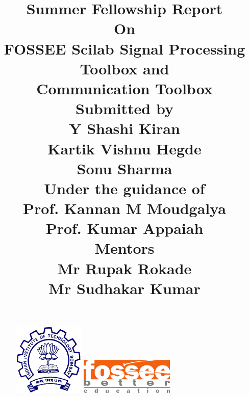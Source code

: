 \documentclass[12pt,a4paper]{report}
\begin{document}
\begin{figure}
\centering
\includegraphics[width = 0.3\textwidth]{iit.png}
\hspace{1cm}
\includegraphics[width = 0.4\textwidth]{fossee-logo.png}
\end{figure}

\title{\textbf{\textbf{Summer Fellowship Report}}\vspace{3mm} \\\small On \\\vspace{3mm} \textbf{\large FOSSEE Scilab Signal Processing Toolbox and\\ Communication Toolbox}\vspace{3mm} \\ \vspace{3mm}\small Submitted by\\  \vspace{3mm}  \large \textbf{Y Shashi Kiran}\\ \vspace{2mm}  \large \textbf{Kartik Vishnu Hegde}\\ \vspace{2mm}  \large \textbf{Sonu Sharma}\\ \vspace{7mm}
\small Under the guidance of \\  \vspace{3mm}
\large \textbf{Prof. Kannan M Moudgalya} \vspace{1mm}\\
\large \textbf{Prof. Kumar Appaiah} \vspace{5 mm}\\
\small Mentors
\\ 
\vspace{1mm} \large \textbf{Mr Rupak Rokade}\\ 
\vspace{1mm}  \large \textbf{Mr Sudhakar Kumar}\\  
}
\end{document}
